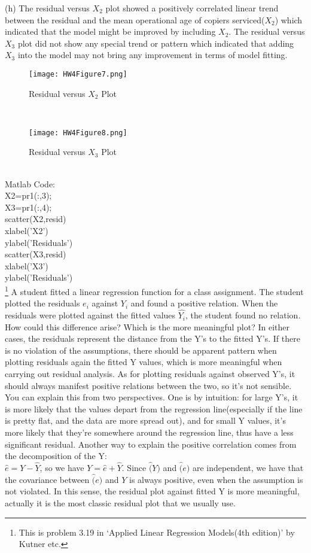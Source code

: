 \documentclass[12pt]{article}
\begin{document}
(h) The residual versus $X_2$ plot showed a positively correlated linear trend between the residual and the mean operational age of copiers serviced($X_2$) which indicated that the model might be improved by including $X_2$. The residual versus$X_3$ plot did not show any special trend or pattern which indicated that adding $X_3$ into the model may not bring any improvement in terms of model fitting.\\
\begin{figure}[h!]
\centering
\graphicspath{{c:/users/qun/desktop/}}
\texttt{[image: HW4Figure7.png]}
\caption{ Residual versus $X_2$ Plot}
\end{figure}\\
\begin{figure}[h!]
\centering
\graphicspath{{c:/users/qun/desktop/}}
\texttt{[image: HW4Figure8.png]}
\caption{ Residual versus $X_3$ Plot}
\end{figure}\\
Matlab Code:\\
X2=pr1(:,3);\\
X3=pr1(:,4);\\
scatter(X2,resid)\\
xlabel('X2')\\
ylabel('Residuals')\\
scatter(X3,resid)\\
xlabel('X3')\\
ylabel('Residuals')\\

 {\footnote[2]{This is
problem 3.19 in `Applied Linear Regression Models(4th edition)' by
Kutner etc.} 
 A student fitted a linear regression function for a class assignment. The student plotted the residuals $e_i$ against $Y_i$ and found a positive relation. When the residuals were plotted against the fitted values $\hat{Y_i}$, the student found no relation. How could this difference arise? Which is the more meaningful plot?
} { \vfill
  \answer
} { In either cases, the residuals represent the distance from the
Y's to the fitted Y's. If there is no violation of the assumptions,
there should be apparent pattern when plotting residuals again the
fitted Y values, which is more meaningful when carrying out residual
analysis. As for plotting residuals against observed Y's, it should
always manifest positive relations between the two, so it's not
sensible. You can explain this from two perspectives. One is by
intuition: for large Y's, it is more likely that the values depart
from the regression line(especially if the line is pretty flat, and
the data are more spread out), and for small Y values, it's more
likely that they're somewhere around the regression line, thus have
a less significant residual.  Another way to explain the positive
correlation comes from the decomposition of the Y:\\
$\hat{e}=Y-\hat{Y}$, so we have $Y=\hat{e}+\hat{Y}$. Since $\hat(Y)$
and $\hat(e)$ are independent, we have that the covariance between
$\hat(e)$ and $Y$ is always positive, even when the assumption is not
violated. In this sense, the residual plot against fitted Y is more
meaningful, actually it is the most classic residual plot that we
usually use. }
\end{document}
